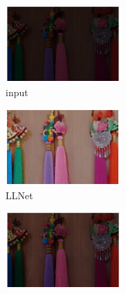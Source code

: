 \documentclass[letterpaper,12pt]{article}
\begin{document}
	\begin{figure}[htbp] 
		\centering 
		\begin{subfigure}{0.18\textwidth}
			\includegraphics[width=\linewidth]{LOL-test_dataset/input}
			\captionsetup{font=scriptsize}
			\caption{input}
			\label{fig: LOL-test_a}
		\end{subfigure}
		\begin{subfigure}{0.18\textwidth}
			\includegraphics[width=\linewidth]{LOL-test_dataset/LLNet}
			\captionsetup{font=scriptsize}
			\caption{LLNet}
			\label{fig: LOL-test_b}
		\end{subfigure}
		\begin{subfigure}{0.18\textwidth}
			\includegraphics[width=\linewidth]{LOL-test_dataset/LightenNet}

\end{subfigure}
\end{figure}
\end{document}
